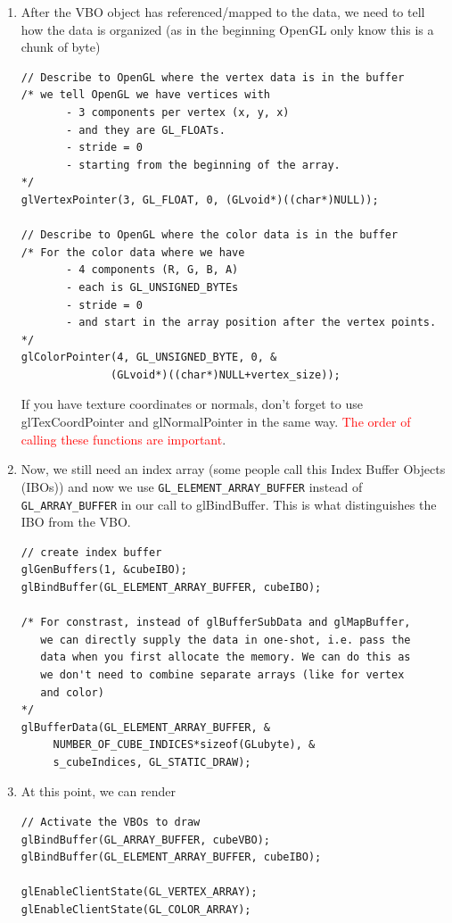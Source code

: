 \begin{enumerate}
\item After the VBO object has referenced/mapped to the data, we need
  to tell how the data is organized (as in the beginning OpenGL only
  know this is a chunk of byte)
\begin{verbatim}
// Describe to OpenGL where the vertex data is in the buffer
/* we tell OpenGL we have vertices with 
       - 3 components per vertex (x, y, x) 
       - and they are GL_FLOATs. 
       - stride = 0
       - starting from the beginning of the array. 
*/
glVertexPointer(3, GL_FLOAT, 0, (GLvoid*)((char*)NULL));

// Describe to OpenGL where the color data is in the buffer
/* For the color data where we have 
       - 4 components (R, G, B, A)
       - each is GL_UNSIGNED_BYTEs
       - stride = 0
       - and start in the array position after the vertex points.
*/
glColorPointer(4, GL_UNSIGNED_BYTE, 0, & 
              (GLvoid*)((char*)NULL+vertex_size));
\end{verbatim}
  If you have texture coordinates or normals, don't forget to use
  glTexCoordPointer and glNormalPointer in the same
  way. \textcolor{red}{The order of calling these functions are
    important}. 

\item Now, we still need an index array (some people call this Index
  Buffer Objects (IBOs)) and now we use \verb!GL_ELEMENT_ARRAY_BUFFER!
  instead of \verb!GL_ARRAY_BUFFER! in our call to glBindBuffer. This
  is what distinguishes the IBO from the VBO.
\begin{verbatim}
// create index buffer
glGenBuffers(1, &cubeIBO);
glBindBuffer(GL_ELEMENT_ARRAY_BUFFER, cubeIBO);

/* For constrast, instead of glBufferSubData and glMapBuffer,
   we can directly supply the data in one-shot, i.e. pass the
   data when you first allocate the memory. We can do this as
   we don't need to combine separate arrays (like for vertex 
   and color)
*/
glBufferData(GL_ELEMENT_ARRAY_BUFFER, & 
     NUMBER_OF_CUBE_INDICES*sizeof(GLubyte), & 
     s_cubeIndices, GL_STATIC_DRAW);
\end{verbatim}

\item At this point, we can render
\begin{verbatim}
// Activate the VBOs to draw
glBindBuffer(GL_ARRAY_BUFFER, cubeVBO);
glBindBuffer(GL_ELEMENT_ARRAY_BUFFER, cubeIBO);

glEnableClientState(GL_VERTEX_ARRAY);
glEnableClientState(GL_COLOR_ARRAY);


\end{verbatim}
\end{enumerate}
